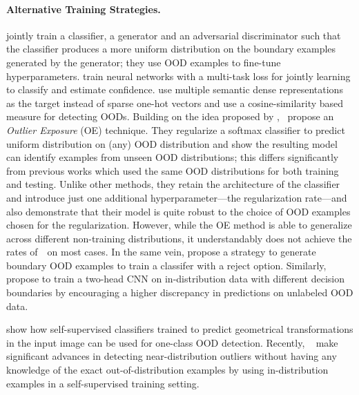 \documentclass{article}
\begin{document}
\paragraph{Alternative Training Strategies.}  \cite{lee2018training} jointly train a classifier, a generator and an adversarial discriminator such that the classifier produces a more uniform distribution on the boundary examples generated by the generator; they use OOD examples to fine-tune hyperparameters. \cite{devries2018learning} train neural networks with a multi-task loss for jointly learning to classify and estimate confidence. \cite{shalev2018out} use multiple semantic dense representations as the target instead of sparse one-hot vectors and use a cosine-similarity based measure for detecting OODs. Building on the idea proposed by \cite{lee2018training},~\cite{hendrycks2018deep} propose an {\it Outlier Exposure} (OE) technique. They regularize a softmax classifier to predict uniform distribution on (any) OOD distribution and show the resulting model can identify examples from unseen OOD distributions; this differs significantly from previous works which used the same OOD distributions for both training and testing. Unlike other methods, they retain the architecture of the classifier and introduce just one additional hyperparameter---the regularization rate---and also demonstrate that their model is quite robust to the choice of OOD examples chosen for the regularization. However, while the OE method is able to generalize across different non-training distributions, it understandably does not achieve the rates of~\cite{lee2018simple}~on most cases. In the same vein, \cite{vernekar2019out} propose a strategy to generate boundary OOD examples to train a classifer with a reject option. Similarly, \cite{unsup} propose to train a two-head CNN on in-distribution data with different decision boundaries by encouraging a higher discrepancy in predictions on unlabeled OOD data.

\cite{geometric} show how self-supervised classifiers trained to predict geometrical transformations in the input image can be used for one-class OOD detection. Recently, ~\cite{hendrycks2019selfsupervised} make significant advances in detecting near-distribution outliers without having any knowledge of the exact out-of-distribution examples by using in-distribution examples in a self-supervised training setting.
\end{document}
